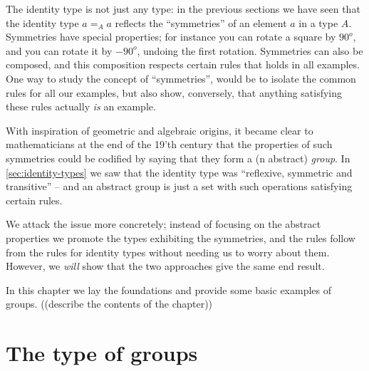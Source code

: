 \label{ch:groups}



The identity type is not just any type:  in the previous sections we have seen that the identity type $a=_Aa$ reflects the ``symmetries'' of an element $a$ in a type $A$.  
Symmetries have special properties; for instance you can rotate a square by $90^o$, and you can rotate it by $-90^o$, undoing the first rotation.
Symmetries can also be composed, and this composition respects certain rules that holds in all examples.  One way to study the concept of ``symmetries'', would be to isolate the common rules for all our examples, but also show, conversely, that anything satisfying these rules actually \emph{is} an example. 




With inspiration of geometric and algebraic origins, it became clear to mathematicians at the end of the 19'th century that the properties of such symmetries could be codified by saying that they form a (n abstract) \emph{group}. 
In \cref{sec:identity-types} we saw that the identity type was ``reflexive, symmetric and transitive'' -- and an abstract group is just a set with such operations satisfying certain rules.


We attack the issue more concretely; instead of focusing on the abstract properties we promote the types exhibiting the symmetries, and the rules follow from the rules for identity types without needing us to worry about them.  However, we \emph{will} show that the two approaches give the same end result.  

In this chapter we lay the foundations and provide some basic examples of groups.  ((describe the contents of the chapter))

\section{The type of groups}
\label{sec:typegroup}

